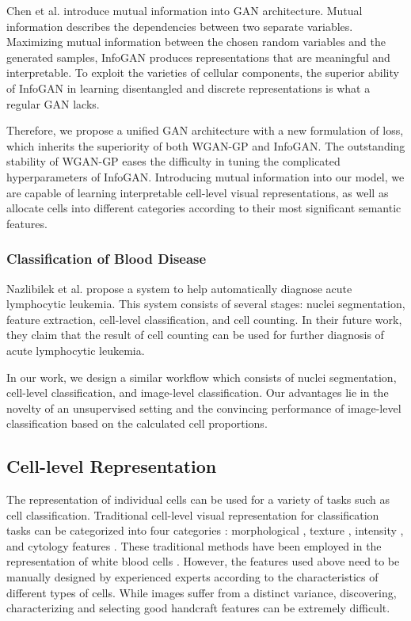 \documentclass[journal]{IEEEtran}
\begin{document}
Chen et al. \cite{chen2016infoGAN} introduce mutual information into GAN architecture. Mutual information describes the dependencies between two separate variables. Maximizing mutual information between the chosen random variables and the generated samples, InfoGAN produces representations that are meaningful and interpretable. To exploit the varieties of cellular components, the superior ability of InfoGAN in learning disentangled and discrete representations is what a regular GAN lacks.

Therefore, we propose a unified GAN architecture with a new formulation of loss, which inherits the superiority of both WGAN-GP and InfoGAN. The outstanding stability of WGAN-GP eases the difficulty in tuning the complicated hyperparameters of InfoGAN. Introducing mutual information into our model, we are capable of learning interpretable cell-level visual representations, as well as allocate cells into different categories according to their most significant semantic features.



\subsubsection{Classification of Blood Disease}



Nazlibilek et al. \cite{Nazlibilek2014Automatic} propose a system to help automatically diagnose acute lymphocytic leukemia. This system consists of several stages: nuclei segmentation, feature extraction, cell-level classification, and cell counting. In their future work, they claim that the result of cell counting can be used for further diagnosis of acute lymphocytic leukemia.

In our work, we design a similar workflow which consists of nuclei segmentation, cell-level classification, and image-level classification. Our advantages lie in the novelty of an unsupervised setting and the convincing performance of image-level classification based on the calculated cell proportions.

\subsection{Cell-level Representation}

The representation of individual cells can be used for a variety of tasks such as cell classification. Traditional cell-level visual representation for classification tasks can be categorized into four categories \cite{Y2014Methods}: morphological \cite{Muthu2012Hybrid}, texture \cite{Xu2015Dual,Lorenzo2013Cervical}, intensity \cite{Dundar2011Computerized}, and cytology features \cite{Nguyen2011Prostate}. These traditional methods have been employed in the representation of white blood cells \cite{Tai2011Blood,Putzu2014Leucocyte,Su2014A}. However, the features used above need to be manually designed by experienced experts according to the characteristics of different types of cells. While images suffer from a distinct variance, discovering, characterizing and selecting good handcraft features can be extremely difficult.
\end{document}
